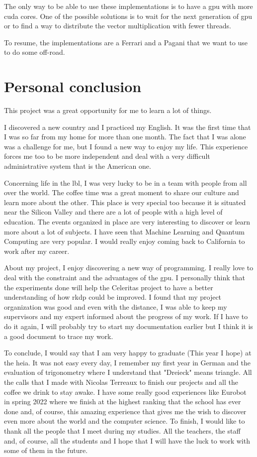 The only way to be able to use these implementations is to have a \acrshort{gpu}
with more \acrshort{cuda} cores.
One of the possible solutions is to wait for the next generation of \acrshort{gpu} or
to find a way to distribute the vector multiplication with fewer threads.

To resume, the implementations are a Ferrari and a Pagani that we want to use to
do some off-road.

\section{Personal conclusion}
\label{ch:conclusion:personal}

This project was a great opportunity for me to learn a lot of things.

I discovered a new country and I practiced my English.
It was the first time that I was so far from my home for more than one month.
The fact that I was alone was a challenge for me, but I found a new way to enjoy
my life.
This experience forces me too to be more independent and deal with
a very difficult administrative system that is the American one.

Concerning life in the \acrshort{lbl}, I was very lucky to be in a team with
people from all over the world.
The coffee time was a great moment to share our culture and learn more about
the other.
This place is very special too because it is situated near the Silicon Valley
and there are a lot of people with a high level of education.
The events organized in place are very interesting to discover or learn more
about a lot of subjects.
I have seen that Machine Learning and Quantum Computing are very
popular.
I would really enjoy coming back to California to work after my career.

About my project, I enjoy discovering a new way of programming.
I really love to deal with the constraint and the advantages of the \acrshort{gpu}.
I personally think that the experiments done will help the Celeritas project to
have a better understanding of how \acrshort{rkdp} could be improved.
I found that my project organization was good and even with the distance, I was
able to keep my supervisors and my expert informed about the progress of my work.
If I have to do it again, I will probably try to start my documentation earlier
but I think it is a good document to trace my work.

To conclude, I would say that I am very happy to graduate (This year I hope)
at the \acrshort{heia}.
It was not easy every day, I remember my first year in German and the evaluation
of trigonometry where I understand that "Dreieck" means triangle.
All the calls that I made with Nicolas Terreaux to finish our projects and all
the coffee we drink to stay awake.
I have some really good experiences like Eurobot in spring 2022 where we finish
at the highest ranking that the school has ever done and, of course, this
amazing experience that gives me the wish to discover even more about the world and
the computer science.
To finish, I would like to thank all the people that I meet during my studies.
All the teachers, the staff and, of course, all the students and I hope that I
will have the luck to work with some of them in the future.
